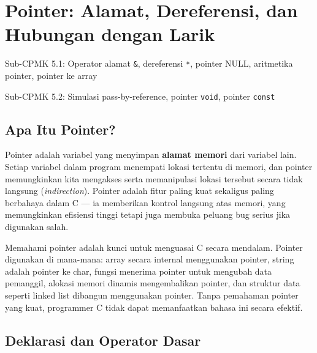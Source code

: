 \documentclass[../main.tex]{subfiles}
\begin{document}
\chapter{Pointer: Alamat, Dereferensi, dan Hubungan dengan Larik}

\begin{subcpmk}
  \item Sub-CPMK 5.1: Operator alamat \texttt{\&}, dereferensi \texttt{*}, pointer NULL, aritmetika pointer, pointer ke array
  \item Sub-CPMK 5.2: Simulasi pass-by-reference, pointer \texttt{void}, pointer \texttt{const}
\end{subcpmk}


\section{Apa Itu Pointer?}

Pointer adalah variabel yang menyimpan \textbf{alamat memori} dari variabel lain. Setiap variabel dalam program menempati lokasi tertentu di memori, dan pointer memungkinkan kita mengakses serta memanipulasi lokasi tersebut secara tidak langsung (\textit{indirection}). Pointer adalah fitur paling kuat sekaligus paling berbahaya dalam C --- ia memberikan kontrol langsung atas memori, yang memungkinkan efisiensi tinggi tetapi juga membuka peluang bug serius jika digunakan salah.

Memahami pointer adalah kunci untuk menguasai C secara mendalam. Pointer digunakan di mana-mana: array secara internal menggunakan pointer, string adalah pointer ke char, fungsi menerima pointer untuk mengubah data pemanggil, alokasi memori dinamis mengembalikan pointer, dan struktur data seperti linked list dibangun menggunakan pointer. Tanpa pemahaman pointer yang kuat, programmer C tidak dapat memanfaatkan bahasa ini secara efektif.

\section{Deklarasi dan Operator Dasar}
\end{document}
